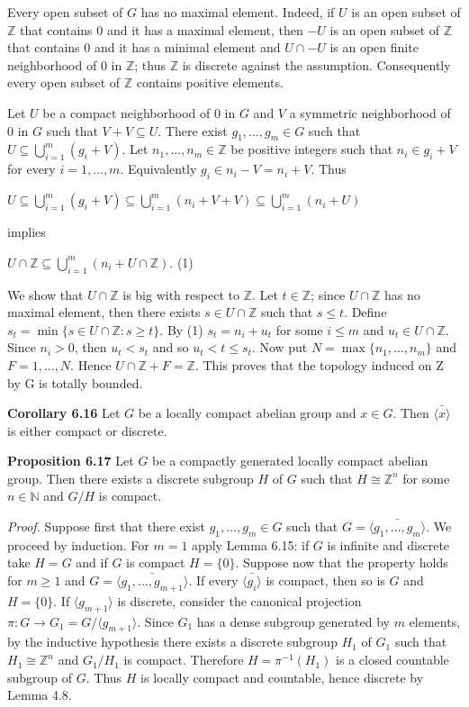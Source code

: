 \documentclass[12pt]{article}
\begin{document}
\begin{itemize}
\begin{itemize}
    Every open subset of $G$ has no maximal element. Indeed, if $U$ is an open subset of $\mathbb{Z}$ that contains 0 and
it has a maximal element, then $-U$ is an open subset of $\mathbb{Z}$ that contains 0 and it has a minimal element and
$U \cap -U$ is an open finite neighborhood of 0 in $\mathbb{Z}$; thus $\mathbb{Z}$ is discrete against the assumption. Consequently every
open subset of $\mathbb{Z}$ contains positive elements.


    Let $U$ be a compact neighborhood of 0 in $G$ and $V$ a symmetric neighborhood of 0 in $G$ such that $V +V \subseteq U$.
There exist $g_1, . . . , g_m \in G$ such that $U \subseteq \bigcup^m_{i=1} (g_i + V)$. Let $n_1, . . . , n_m \in \mathbb{Z}$ be positive integers such that
$n_i \in g_i + V$ for every $i = 1, . . . , m$. Equivalently $g_i \in n_i - V = n_i + V$. Thus


    $U \subseteq \bigcup^m_{i=1}(g_i + V ) \subseteq \bigcup^m_{i=1}(n_i + V + V ) \subseteq \bigcup^m_{i=1}(n_i + U)$


implies


    $U \cap \mathbb{Z} \subseteq \bigcup^m_{i=1}(n_i + U \cap \mathbb{Z})$. (1)


We show that $U \cap \mathbb{Z}$ is big with respect to $\mathbb{Z}$. Let $t \in \mathbb{Z}$; since $U \cap \mathbb{Z}$ has no maximal element, then there exists
$s \in U \cap \mathbb{Z}$ such that $s \leq t$. Define $s_t = \min \{s \in U \cap \mathbb{Z} : s \geq t\}$. By (1) $s_t = n_i + u_t$ for some $i \leq m$ and
$u_t \in U \cap \mathbb{Z}$. Since $n_i > 0$, then $u_t < s_t$ and so $u_t < t \leq s_t$. Now put $N = \max \{n_1, . . . , n_m\}$ and $F = {1, . . . , N}$.
Hence $U \cap \mathbb{Z} + F = \mathbb{Z}$. This proves that the topology induced on Z by G is totally bounded.


\textbf{Corollary 6.16} Let $G$ be a locally compact abelian group and $x \in G$. Then $\bar{\langle x \rangle}$ is either compact or discrete.


\textbf{Proposition 6.17} Let $G$ be a compactly generated locally compact abelian group. Then there exists a discrete
subgroup $H$ of $G$ such that $H \cong \mathbb{Z}^n$ for some $n \in \mathbb{N}$ and $G/H$ is compact.


    \emph{Proof.} Suppose first that there exist $g_1, . . . , g_m \in G$ such that $G = \bar{\langle g_1, . . . , g_m \rangle}$. We proceed by induction. For
$m = 1$ apply Lemma 6.15: if $G$ is infinite and discrete take $H = G$ and if $G$ is compact $H = \{0\}$. Suppose
now that the property holds for $m \geq 1$ and $G = \bar{\langle g_1, . . . , g_{m+1} \rangle}$. If every $\bar{\langle g_i \rangle}$ is compact, then so is $G$ and
$H = \{0\}$. If $\langle g_{m+1} \rangle$ is discrete, consider the canonical projection $\pi : G \to G_1 = G/\langle g_{m+1} \rangle$. Since $G_1$ has a
dense subgroup generated by $m$ elements, by the inductive hypothesis there exists a discrete subgroup $H_1$ of
$G_1$ such that $H_1 \cong \mathbb{Z}^n$ and $G_1 / H_1$ is compact. Therefore $H = \pi^{-1}(H_1)$ is a closed countable subgroup of $G$.
Thus $H$ is locally compact and countable, hence discrete by Lemma 4.8.



\end{itemize}
\end{itemize}
\end{document}
